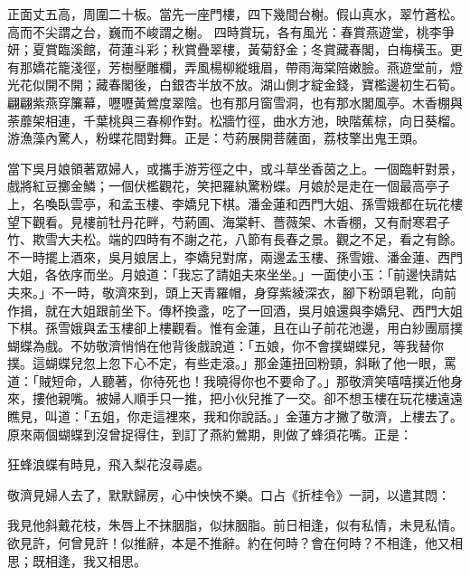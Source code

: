 \begin{showcontents}{}
正面丈五高，周圍二十板。當先一座門樓，四下幾間台榭。假山真水，翠竹蒼松。高而不尖謂之台，巍而不峻謂之榭。
四時賞玩，各有風光：春賞燕遊堂，桃李爭妍；夏賞臨溪館，荷蓮斗彩；秋賞疊翠樓，黃菊舒金；冬賞藏春閣，白梅橫玉。更有那嬌花籠淺徑，芳樹壓雕欄，弄風楊柳縱蛾眉，帶雨海棠陪嫩臉。燕遊堂前，燈光花似開不開；藏春閣後，白銀杏半放不放。湖山側才綻金錢，寶檻邊初生石筍。翩翩紫燕穿簾幕，嚦嚦黃鶯度翠陰。也有那月窗雪洞，也有那水閣風亭。木香棚與荼蘼架相連，千葉桃與三春柳作對。松牆竹徑，曲水方池，映階蕉棕，向日葵榴。游漁藻內驚人，粉蝶花間對舞。正是：芍葯展開菩薩面，荔枝擎出鬼王頭。

當下吳月娘領著眾婦人，或攜手游芳徑之中，或斗草坐香茵之上。一個臨軒對景，戲將紅豆擲金鱗；一個伏檻觀花，笑把羅紈驚粉蝶。月娘於是走在一個最高亭子上，名喚臥雲亭，和孟玉樓、李嬌兒下棋。潘金蓮和西門大姐、孫雪娥都在玩花樓望下觀看。見樓前牡丹花畔，芍葯圃、海棠軒、薔薇架、木香棚，又有耐寒君子竹、欺雪大夫松。端的四時有不謝之花，八節有長春之景。觀之不足，看之有餘。不一時擺上酒來，吳月娘居上，李嬌兒對席，兩邊孟玉樓、孫雪娥、潘金蓮、西門大姐，各依序而坐。月娘道：「我忘了請姐夫來坐坐。」一面使小玉：「前邊快請姑夫來。」不一時，敬濟來到，頭上天青羅帽，身穿紫綾深衣，腳下粉頭皂靴，向前作揖，就在大姐跟前坐下。傳杯換盞，吃了一回酒，吳月娘還與李嬌兒、西門大姐下棋。孫雪娥與孟玉樓卻上樓觀看。惟有金蓮，且在山子前花池邊，用白紗團扇撲蝴蝶為戲。不妨敬濟悄悄在他背後戲說道：「五娘，你不會撲蝴蝶兒，等我替你撲。這蝴蝶兒忽上忽下心不定，有些走滾。」那金蓮扭回粉頸，斜瞅了他一眼，罵道：「賊短命，人聽著，你待死也！我曉得你也不要命了。」那敬濟笑嘻嘻撲近他身來，摟他親嘴。被婦人順手只一推，把小伙兒推了一交。卻不想玉樓在玩花樓遠遠瞧見，叫道：「五姐，你走這裡來，我和你說話。」金蓮方才撇了敬濟，上樓去了。原來兩個蝴蝶到沒曾捉得住，到訂了燕約鶯期，則做了蜂須花嘴。正是：

狂蜂浪蝶有時見，飛入梨花沒尋處。

敬濟見婦人去了，默默歸房，心中怏怏不樂。口占《折桂令》一詞，以遣其悶：

我見他斜戴花枝，朱唇上不抹胭脂，似抹胭脂。前日相逢，似有私情，未見私情。欲見許，何曾見許！似推辭，本是不推辭。約在何時？會在何時？不相逢，他又相思；既相逢，我又相思。


\end{showcontents}
